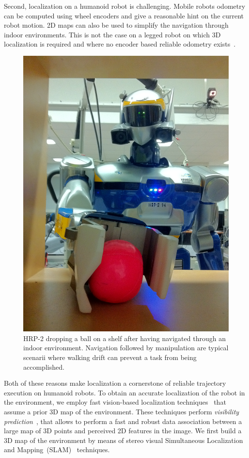 Second, localization on a humanoid robot is challenging. Mobile
robots odometry can be computed using wheel encoders and give a
reasonable hint on the current robot motion. 2D maps can also be used
to simplify the navigation through indoor environments. This is not
the case on a legged robot on which 3D localization is required and
where no encoder based reliable odometry exists~\citep{Hornung10iros}.
%
\begin{figure}[ht]
  \begin{center}
    \includegraphics[width=.9\linewidth]{images/demo1.JPG}
  \end{center}
  \caption{HRP-2 dropping a ball on a shelf after having navigated
    through an indoor environment. Navigation followed by manipulation
    are typical scenarii where walking drift can prevent a task from
    being accomplished.\label{fig:xp_final}}
\end{figure}
%
Both of these reasons make localization a cornerstone of reliable
trajectory execution on humanoid robots. To obtain an accurate
localization of the robot in the environment, we employ fast
vision-based localization techniques~\cite{Alcantarilla10icra} that
assume a prior 3D map of the environment. These techniques perform
\textit{visibility prediction}~\cite{Alcantarilla11icra}, that allows
to perform a fast and robust data association between a large map of
3D points and perceived 2D features in the image. We first build a
3D map of the environment by means of stereo visual Simultaneous
Localization and Mapping~(SLAM)~\cite{Davison07pami,Konolige08tro}
techniques.

